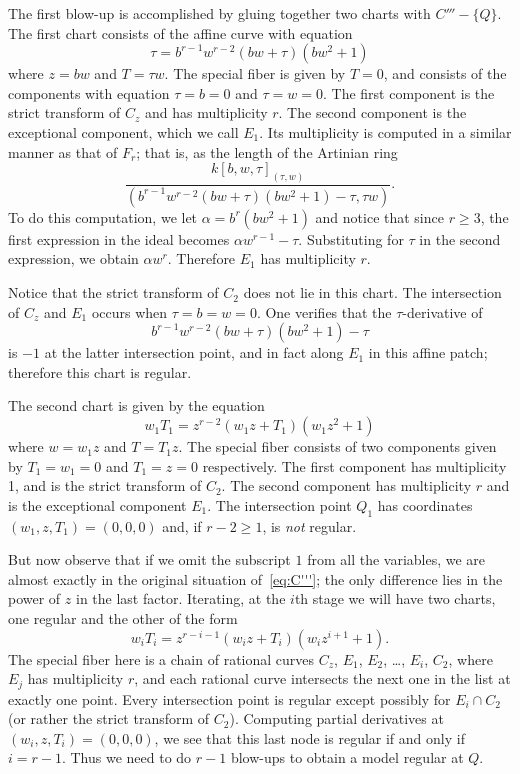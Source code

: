 \documentclass{article}
\theoremstyle{plain}
\theoremstyle{definition}
\theoremstyle{remark}
\begin{document}
The first blow-up is accomplished by gluing together two charts with $C'''-\{Q\}$. The first chart consists of the affine curve with equation
\[
\tau = b^{r-1} w^{r-2} (bw + \tau) (b w^2 + 1)
\]
where $z = bw$ and $T = \tau w$. The special fiber is given by $T = 0$, and consists of the components with equation $\tau = b = 0$ and $\tau = w = 0$. The first component is the strict transform of ${C_z}$ and has multiplicity $r$. The second component is the exceptional component, which we call $E_1$. Its multiplicity is computed in a similar manner as that of $F_r$; that is, as the length of the Artinian ring
\[
\frac{k[b,w,\tau]_{(\tau, w)}}{(b^{r-1}w^{r-2}(bw + \tau)(bw^2 + 1) - \tau, \tau w)}.
\]
To do this computation, we let $\alpha = b^r(bw^2 + 1)$ and notice that since $r \geq 3$, the first expression in the ideal becomes $\alpha w^{r-1} - \tau$. Substituting for $\tau$ in the second expression, we obtain $\alpha w^r$. Therefore $E_1$ has multiplicity $r$.

Notice that the strict transform of $C_2$ does not lie in this chart. The intersection of $C_z$ and $E_1$ occurs when $\tau = b = w = 0$. One verifies that the $\tau$-derivative of 
\[
b^{r-1}w^{r-2}(bw + \tau)(bw^2 + 1) - \tau
\]
is $-1$ at the latter intersection point, and in fact along $E_1$ in this affine patch; therefore this chart is regular.

The second chart is given by the equation
\[
w_1 T_1 = z^{r-2}(w_1z + T_1)(w_1 z^2 + 1)
\]
where $w = w_1 z$ and $T = T_1 z$. The special fiber consists of two components given by $T_1 = w_1 = 0$ and $T_1 = z = 0$ respectively. The first component has multiplicity 1, and is the strict transform of $C_2$. The second component has multiplicity $r$ and is the exceptional component $E_{1}$. The intersection point $Q_1$ has coordinates $(w_1, z, T_1) = (0,0,0)$ and, if $r - 2 \geq 1$, is \emph{not} regular.

But now observe that if we omit the subscript $1$ from all the variables, we are almost exactly in the original situation of~\eqref{eq:C'''}; the only difference lies in the power of $z$ in the last factor. Iterating, at the $i$th stage we will have two charts, one regular and the other of the form
\[
w_i T_i = z^{r-i-1}(w_iz + T_i)(w_i z^{i+1} + 1).
\]
The special fiber here is a chain of rational curves ${C_z}$, $E_{1}$, $E_{2}$, \dots, $E_{i}$, ${C_2}$, where $E_j$ has multiplicity $r$, and each rational curve intersects the next one in the list at exactly one point. Every intersection point is regular except possibly for $E_{i} \cap C_2$ (or rather the strict transform of $C_2$). Computing partial derivatives at $(w_i, z, T_i) = (0,0,0)$, we see that this last node is regular if and only if $i = r - 1$. Thus we need to do $r - 1$ blow-ups to obtain a model regular at $Q$.
\end{document}
